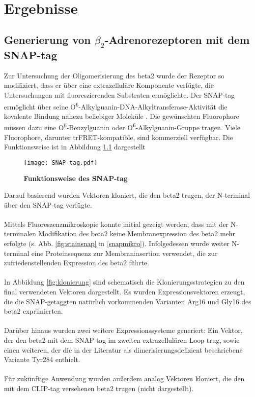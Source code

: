 \chapter{Ergebnisse} \label{chapter:ergebnisse}
\section{Generierung von $\beta_2$-Adrenorezeptoren mit dem SNAP-tag} \label{klonierung}
Zur Untersuchung der Oligomerisierung des \gls{beta2} wurde der Rezeptor so modifiziert, dass er über eine extrazelluläre Komponente verfügte, die Untersuchungen mit fluoreszierenden Substraten ermöglichte. Der SNAP-tag ermöglicht über seine O\textsuperscript{6}-Alkylguanin-DNA-Alkyltransferase-Aktivität die kovalente Bindung nahezu beliebiger Moleküle \parencite{Gronemeyer2006}. Die gewünschten Fluorophore müssen dazu eine O\textsuperscript{6}-Benzylguanin oder O\textsuperscript{6}-Alkylguanin-Gruppe tragen. Viele Fluorophore, darunter trFRET-kompatible, sind kommerziell verfügbar. Die Funktionsweise ist in Abbildung \ref{fig:snap-tag} dargestellt

\begin{figure}[htp]
    \texttt{[image: SNAP-tag.pdf]}
    \caption{\textbf{Funktionsweise des SNAP-tag}}
    \label{fig:snap-tag}
\end{figure}

Darauf basierend wurden Vektoren kloniert, die den \gls{beta2} trugen, der N-terminal über den SNAP-tag verfügte. 
\\ \\
Mittels Fluoreszenzmikroskopie konnte initial gezeigt werden, dass mit der N-terminalen Modifikation des \gls{beta2} keine Membranexpression des \gls{beta2} mehr erfolgte (s. Abb. \ref{fig:stainsnap} in \ref{snapmikro}). Infolgedessen wurde weiter N-terminal eine Proteinsequenz zur Membraninsertion verwendet, die zur zufriedenstellenden Expression des \gls{beta2} führte. 
\\ \\
In Abbildung \ref{fig:klonierung} sind schematisch die Klonierungsstrategien zu den final verwendeten Vektoren dargestellt. Es wurden Expressionsvektoren erzeugt, die die SNAP-getaggten natürlich vorkommenden Varianten Arg16 und Gly16 des \gls{beta2} exprimierten.
\\ \\ 
Darüber hinaus wurden zwei weitere Expressionssysteme generiert: Ein Vektor, der den \gls{beta2} mit dem SNAP-tag im zweiten extrazellulären Loop trug, sowie einen weiteren, der die in der Literatur als dimerisierungsdefizient beschriebene Variante Tyr284 \parencite{Salahpour2004} enthielt.
\\ \\
Für zukünftige Anwendung wurden außerdem analog Vektoren kloniert, die den mit dem CLIP-tag versehenen \gls{beta2} trugen (nicht dargestellt). 


